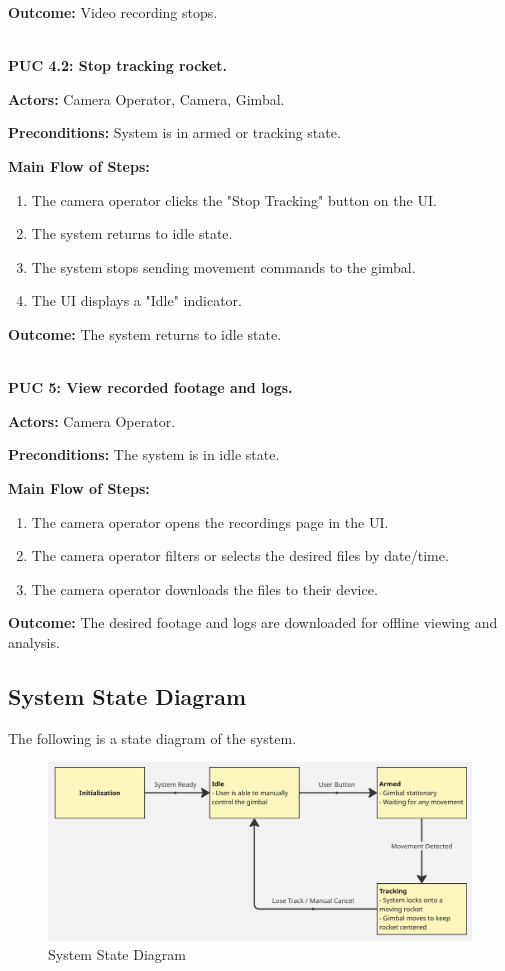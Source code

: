 \documentclass[12pt]{article}
\begin{document}
\textbf{Outcome:} Video recording stops.

~\\

\textbf{PUC 4.2: Stop tracking rocket.}

\textbf{Actors:} Camera Operator, Camera, Gimbal.

\textbf{Preconditions:} System is in armed or tracking state.

\textbf{Main Flow of Steps:}
\begin{enumerate}
  \item The camera operator clicks the "Stop Tracking" button on the UI.
  \item The system returns to idle state.
  \item The system stops sending movement commands to the gimbal.
  \item The UI displays a "Idle" indicator.
\end{enumerate}

\textbf{Outcome:} The system returns to idle state.

~\\

\textbf{PUC 5: View recorded footage and logs.}

\textbf{Actors:} Camera Operator.

\textbf{Preconditions:} The system is in idle state.

\textbf{Main Flow of Steps:}
\begin{enumerate}
  \item The camera operator opens the recordings page in the UI.
  \item The camera operator filters or selects the desired files by date/time.
  \item The camera operator downloads the files to their device.
\end{enumerate}

\textbf{Outcome:} The desired footage and logs are downloaded for offline viewing and analysis.

\subsection{System State Diagram}

The following is a state diagram of the system.

\FloatBarrier
\begin{figure}[h]
  \centering
  \includegraphics[width=\textwidth,height=\textheight,keepaspectratio]{../Images/state_diagram.png}
  \caption{System State Diagram}
  \label{img:state-diagram}
\end{figure}
\FloatBarrier
\end{document}
